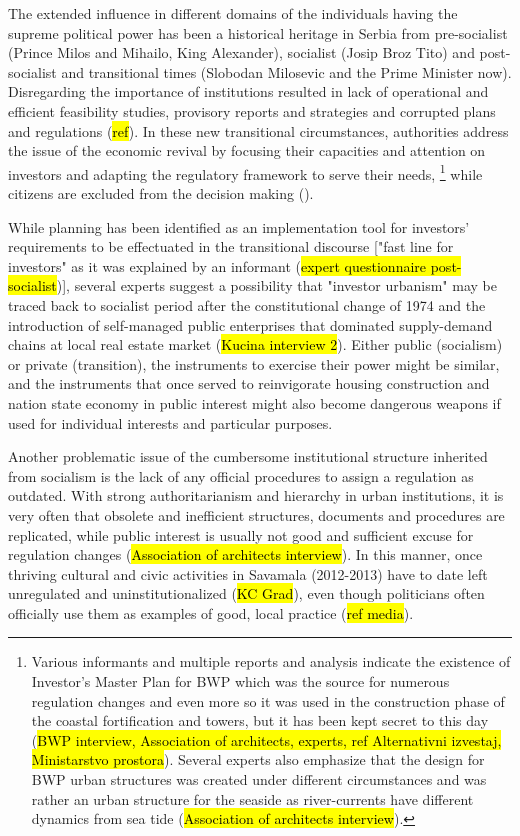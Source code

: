 \documentclass[11pt]{report}
\begin{document}
\begin{itemize}
The extended influence in different domains of the individuals having the supreme political power has been a historical heritage in Serbia from pre-socialist (Prince Milos and Mihailo, King Alexander), socialist (Josip Broz Tito) and post-socialist and transitional times (Slobodan Milosevic and the Prime Minister now).
Disregarding the importance of institutions resulted in lack of operational and efficient feasibility studies, provisory reports and strategies and corrupted plans and regulations (\hl{ref}).
In these new transitional circumstances, authorities address the issue of the economic revival by focusing their capacities and attention on investors and adapting the regulatory framework to serve their needs,
\footnote{Various informants and multiple reports and analysis indicate the existence of Investor's Master Plan for BWP which was the source for numerous regulation changes and even more so it was used in the construction phase of the coastal fortification and towers, but it has been kept secret to this day (\hl{BWP interview, Association of architects, experts, ref Alternativni izvestaj, Ministarstvo prostora}).
Several experts also emphasize that the design for BWP urban structures was created under different circumstances and was rather an urban structure for the seaside as river-currents have different dynamics from sea tide (\hl{Association of architects interview}).}
while citizens are excluded from the decision making (\cite{Urbani razvoj u Srbiji Ministry of Space 2014}).

While planning has been identified as an implementation tool for investors' requirements to be effectuated in the transitional discourse ["fast line for investors" as it was explained by an informant (\hl{expert questionnaire post-socialist})],
several experts suggest a possibility that "investor urbanism" may be traced back to socialist period after the constitutional change of 1974 and the introduction of self-managed public enterprises that dominated supply-demand chains at local real estate market (\hl{Kucina interview 2}).
Either public (socialism) or private (transition), the instruments to exercise their power might be similar, and the instruments that once served to reinvigorate housing construction and nation state economy in public interest might also become dangerous weapons if used for individual interests and particular purposes.

Another problematic issue of the cumbersome institutional structure inherited from socialism is the lack of any official procedures to assign a regulation as outdated.
With strong authoritarianism and hierarchy in urban institutions, it is very often that obsolete and inefficient structures, documents and procedures are replicated, while public interest is usually not good and sufficient excuse for regulation changes (\hl{Association of architects interview}).
In this manner, once thriving cultural and civic activities in Savamala (2012-2013) have to date left unregulated and uninstitutionalized (\hl{KC Grad}), even though politicians often officially use them as examples of good, local practice (\hl{ref media}).
\\


\end{itemize}
\end{document}
